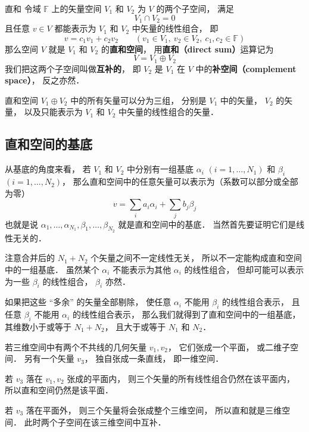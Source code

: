 
\begin{definition}{直和}\label{DirSum_def1}
令域 $\mathbb F$ 上的矢量空间 $V_1$ 和 $V_2$ 为 $V$ 的两个子空间， 满足
\begin{equation}
V_1 \cap V_2 = \qty{0}
\end{equation}
且任意 ${v} \in V$ 都能表示为 $V_1$ 和 $V_2$ 中矢量的线性组合， 即
\begin{equation}
{v} = c_1 {v_1} + c_2 {v_2}
\qquad
({v_1} \in V_1,\ {v_2} \in V_2,\ c_1, c_2 \in \mathbb F)
\end{equation}
那么空间 $V$ 就是 $V_1$ 和 $V_2$ 的\textbf{直和空间}， 用\textbf{直和（direct sum）}运算记为
\begin{equation}
V = V_1 \oplus V_2
\end{equation}
我们把这两个子空间叫做\textbf{互补的}， 即 $V_2$ 是 $V_1$ 在 $V$ 中的\textbf{补空间（complement space）}， 反之亦然．
\end{definition}

直和空间 $V_1 \oplus V_2$ 中的所有矢量可以分为三组， 分别是 $V_1$ 中的矢量， $V_2$ 的矢量， 以及只能表示为 $V_1$ 和 $V_2$ 中矢量的线性组合的矢量．

\subsection{直和空间的基底}
从基底的角度来看， 若 $V_1$ 和 $V_2$ 中分别有一组基底 ${\alpha_i}$ $(i = 1, \dots, N_1)$ 和 ${\beta_i}$ $(i = 1, \dots, N_2)$， 那么直和空间中的任意矢量可以表示为（系数可以部分或全部为零）
\begin{equation}
{v} = \sum_i a_i {\alpha_i} + \sum_j b_j {\beta_j}
\end{equation}
也就是说 $\alpha_1, \dots, \alpha_{N_1}, \beta_1, \dots, \beta_{N_2}$ 就是直和空间中的基底． 当然首先要证明它们是线性无关的．

注意合并后的 $N_1 + N_2$ 个矢量之间不一定线性无关， 所以不一定能构成直和空间中的一组基底． 虽然某个 ${\alpha_i}$ 不能表示为其他 ${\alpha_i}$ 的线性组合， 但却可能可以表示为一些 ${\beta_i}$ 的线性组合， ${\beta_i}$ 亦然．

如果把这些 “多余” 的矢量全部剔除， 使任意 ${\alpha_i}$ 不能用 ${\beta_i}$ 的线性组合表示， 且任意 ${\beta_i}$ 不能用 ${\alpha_i}$ 的线性组合表示， 那么我们就得到了直和空间中的一组基底， 其维数小于或等于 $N_1 + N_2$， 且大于或等于 $N_1$ 和 $N_2$．

\begin{example}{}\label{DirSum_ex1}
若三维空间中有两个不共线的几何矢量 ${v_1}, {v_2}$， 它们张成一个平面， 或二维子空间． 另有一个矢量 ${v_3}$， 独自张成一条直线， 即一维空间．

若 ${v_3}$ 落在 ${v_1}, {v_2}$ 张成的平面内， 则三个矢量的所有线性组合仍然在该平面内， 所以直和空间仍然是该平面．

若 ${v_3}$ 落在平面外， 则三个矢量将会张成整个三维空间， 所以直和就是三维空间． 此时两个子空间在该三维空间中互补．
\end{example}

